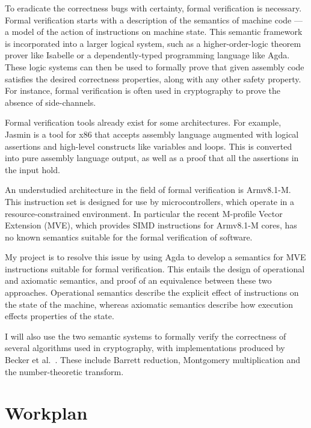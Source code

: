 \documentclass[11pt]{article}
\begin{document}
To eradicate the correctness bugs with certainty, formal verification is
necessary. Formal verification starts with a description of the semantics of
machine code --- a model of the action of instructions on machine state. This
semantic framework is incorporated into a larger logical system, such as a
higher-order-logic theorem prover like Isabelle or a dependently-typed
programming language like Agda. These logic systems can then be used to
formally prove that given assembly code satisfies the desired correctness
properties, along with any other safety property. For instance, formal
verification is often used in cryptography to prove the absence of
side-channels.

Formal verification tools already exist for some architectures. For example,
Jasmin is a tool for x86 that accepts assembly language augmented with logical
assertions and high-level constructs like variables and loops. This is
converted into pure assembly language output, as well as a proof that all the
assertions in the input hold.

An understudied architecture in the field of formal verification is Armv8.1-M.
This instruction set is designed for use by microcontrollers, which operate in
a resource-constrained environment. In particular the recent M-profile Vector
Extension (MVE), which provides SIMD instructions for Armv8.1-M cores, has no
known semantics suitable for the formal verification of software.

My project is to resolve this issue by using Agda to develop a semantics for
MVE instructions suitable for formal verification. This entails the design of
operational and axiomatic semantics, and proof of an equivalence between these
two approaches. Operational semantics describe the explicit effect of
instructions on the state of the machine, whereas axiomatic semantics describe
how execution effects properties of the state.

I will also use the two semantic systems to formally verify the correctness of
several algorithms used in cryptography, with implementations produced by
Becker et al.\ \cite{cryptoeprint_2021_998}. These include Barrett reduction,
Montgomery multiplication and the number-theoretic transform.

\section{Workplan}
\label{sec:org482bea3}
\end{document}
